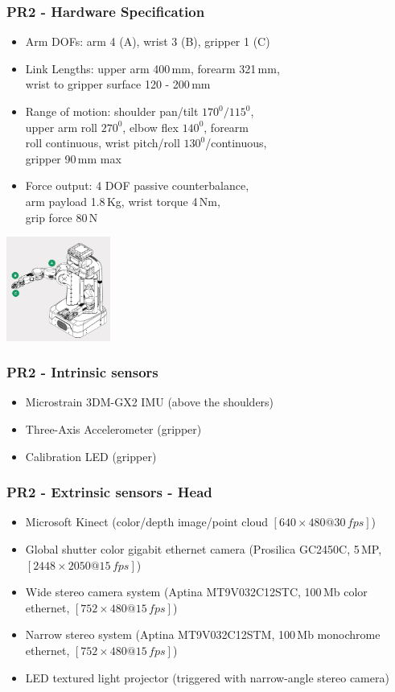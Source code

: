 \begin{frame}
  \frametitle{PR2 - Hardware Specification}
\small{
\begin{itemize}
    \item Arm DOFs: arm 4 (A), wrist 3 (B), gripper 1 (C)
    \item Link Lengths: upper arm 400\,mm, forearm 321\,mm,\\ wrist to gripper surface 120 - 200\,mm
    \item Range of motion: shoulder pan/tilt $170^0/115^0$,\\ upper arm roll $270^0$, elbow flex $140^0$, forearm \\roll continuous, wrist pitch/roll $130^0$/continuous, \\gripper 90\,mm max
    \item Force output: 4 DOF passive counterbalance, \\arm payload 1.8\,Kg, wrist torque 4\,Nm, \\grip force 80\,N
    
\end{itemize}
}
\vspace{-13ex}\hspace{47ex}\includegraphics[width=3.4cm]{img/pr2_arm.png} 
\end{frame}

\begin{frame}
  \frametitle{PR2 - Intrinsic sensors}
\begin{itemize}
    \item Microstrain 3DM-GX2 IMU (above the shoulders)
    \item Three-Axis Accelerometer (gripper)
    \item Calibration LED (gripper) 
\end{itemize}
\end{frame}

\begin{frame}
  \frametitle{PR2 - Extrinsic sensors - Head}
\begin{itemize}
    \item Microsoft Kinect (color/depth image/point cloud $[640\times480 @ 30\,fps]$)
    \item Global shutter color gigabit ethernet camera (Prosilica GC2450C, 5\,MP, $[2448\times2050 @ 15\,fps]$)
    \item Wide stereo camera system (Aptina MT9V032C12STC, 100\,Mb color ethernet, $[752\times480@15\,fps]$)
    \item Narrow stereo system (Aptina MT9V032C12STM, 100\,Mb monochrome ethernet, $[752\times480@15\,fps]$)    
    \item LED textured light projector (triggered with narrow-angle stereo camera)
\end{itemize}
\end{frame}


